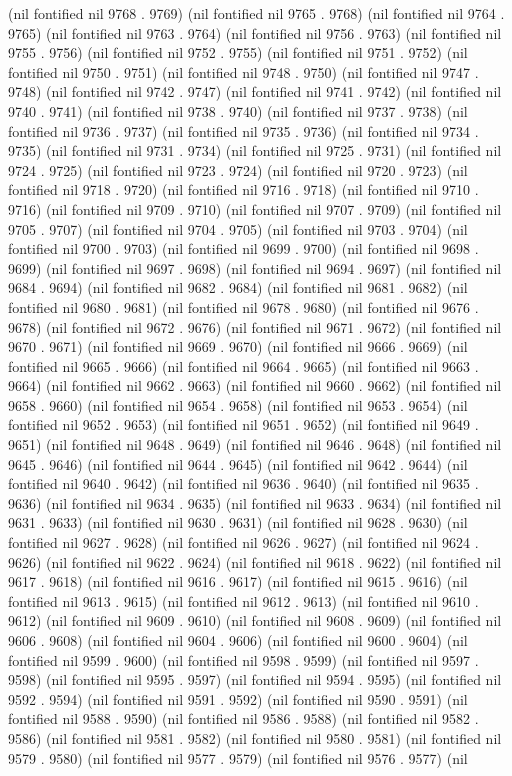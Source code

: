 {{(nil fontified nil 9768 . 9769) (nil fontified nil 9765 . 9768) (nil fontified nil 9764 . 9765) (nil fontified nil 9763 . 9764) (nil fontified nil 9756 . 9763) (nil fontified nil 9755 . 9756) (nil fontified nil 9752 . 9755) (nil fontified nil 9751 . 9752) (nil fontified nil 9750 . 9751) (nil fontified nil 9748 . 9750) (nil fontified nil 9747 . 9748) (nil fontified nil 9742 . 9747) (nil fontified nil 9741 . 9742) (nil fontified nil 9740 . 9741) (nil fontified nil 9738 . 9740) (nil fontified nil 9737 . 9738) (nil fontified nil 9736 . 9737) (nil fontified nil 9735 . 9736) (nil fontified nil 9734 . 9735) (nil fontified nil 9731 . 9734) (nil fontified nil 9725 . 9731) (nil fontified nil 9724 . 9725) (nil fontified nil 9723 . 9724) (nil fontified nil 9720 . 9723) (nil fontified nil 9718 . 9720) (nil fontified nil 9716 . 9718) (nil fontified nil 9710 . 9716) (nil fontified nil 9709 . 9710) (nil fontified nil 9707 . 9709) (nil fontified nil 9705 . 9707) (nil fontified nil 9704 . 9705) (nil fontified nil 9703 . 9704) (nil fontified nil 9700 . 9703) (nil fontified nil 9699 . 9700) (nil fontified nil 9698 . 9699) (nil fontified nil 9697 . 9698) (nil fontified nil 9694 . 9697) (nil fontified nil 9684 . 9694) (nil fontified nil 9682 . 9684) (nil fontified nil 9681 . 9682) (nil fontified nil 9680 . 9681) (nil fontified nil 9678 . 9680) (nil fontified nil 9676 . 9678) (nil fontified nil 9672 . 9676) (nil fontified nil 9671 . 9672) (nil fontified nil 9670 . 9671) (nil fontified nil 9669 . 9670) (nil fontified nil 9666 . 9669) (nil fontified nil 9665 . 9666) (nil fontified nil 9664 . 9665) (nil fontified nil 9663 . 9664) (nil fontified nil 9662 . 9663) (nil fontified nil 9660 . 9662) (nil fontified nil 9658 . 9660) (nil fontified nil 9654 . 9658) (nil fontified nil 9653 . 9654) (nil fontified nil 9652 . 9653) (nil fontified nil 9651 . 9652) (nil fontified nil 9649 . 9651) (nil fontified nil 9648 . 9649) (nil fontified nil 9646 . 9648) (nil fontified nil 9645 . 9646) (nil fontified nil 9644 . 9645) (nil fontified nil 9642 . 9644) (nil fontified nil 9640 . 9642) (nil fontified nil 9636 . 9640) (nil fontified nil 9635 . 9636) (nil fontified nil 9634 . 9635) (nil fontified nil 9633 . 9634) (nil fontified nil 9631 . 9633) (nil fontified nil 9630 . 9631) (nil fontified nil 9628 . 9630) (nil fontified nil 9627 . 9628) (nil fontified nil 9626 . 9627) (nil fontified nil 9624 . 9626) (nil fontified nil 9622 . 9624) (nil fontified nil 9618 . 9622) (nil fontified nil 9617 . 9618) (nil fontified nil 9616 . 9617) (nil fontified nil 9615 . 9616) (nil fontified nil 9613 . 9615) (nil fontified nil 9612 . 9613) (nil fontified nil 9610 . 9612) (nil fontified nil 9609 . 9610) (nil fontified nil 9608 . 9609) (nil fontified nil 9606 . 9608) (nil fontified nil 9604 . 9606) (nil fontified nil 9600 . 9604) (nil fontified nil 9599 . 9600) (nil fontified nil 9598 . 9599) (nil fontified nil 9597 . 9598) (nil fontified nil 9595 . 9597) (nil fontified nil 9594 . 9595) (nil fontified nil 9592 . 9594) (nil fontified nil 9591 . 9592) (nil fontified nil 9590 . 9591) (nil fontified nil 9588 . 9590) (nil fontified nil 9586 . 9588) (nil fontified nil 9582 . 9586) (nil fontified nil 9581 . 9582) (nil fontified nil 9580 . 9581) (nil fontified nil 9579 . 9580) (nil fontified nil 9577 . 9579) (nil fontified nil 9576 . 9577) (nil }}

